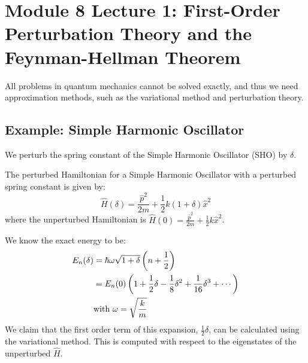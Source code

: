 % 


\section{Module 8 Lecture 1: First-Order Perturbation Theory and the
Feynman-Hellman Theorem}
All problems in quantum mechanics cannot be solved exactly, and thus
we need approximation methods, such as the variational method and
perturbation theory.

\subsection{Example: Simple Harmonic Oscillator}
We perturb the spring constant of the Simple Harmonic Oscillator
(SHO) by $\delta$.

\begin{definition}
  The perturbed Hamiltonian for a Simple Harmonic Oscillator with a
  perturbed spring constant is given by:
  \begin{equation} \label{eq:sho_perturbed_H}
    \hat H(\delta) = \frac{\hat p^2 }{2m} + \frac{1}{2}k(1+\delta)\hat x^2
  \end{equation}
  where the unperturbed Hamiltonian is $\hat H(0) = \frac{\hat p^2
  }{2m} + \frac{1}{2}k\hat x^2$.
\end{definition}

We know the exact energy to be:
\begin{align} \label{eq:sho_exact_energy_taylor}
  E_n(\delta) &= \hbar \omega \sqrt{1+\delta} \left(n+\frac{1}{2}\right) \\
  &= E_n(0)\left(1 + \frac{1}{2}\delta - \frac{1}{8}\delta^2 +
  \frac{1}{16}\delta^3 + \cdots\right) \notag \\
  &\text{with } \omega=\sqrt{\frac{k}{m}} \notag
\end{align}
We claim that the first order term of this expansion,
$\frac{1}{2}\delta$, can be calculated using the variational method.
This is computed with respect to the eigenstates of the unperturbed $\hat H$.


